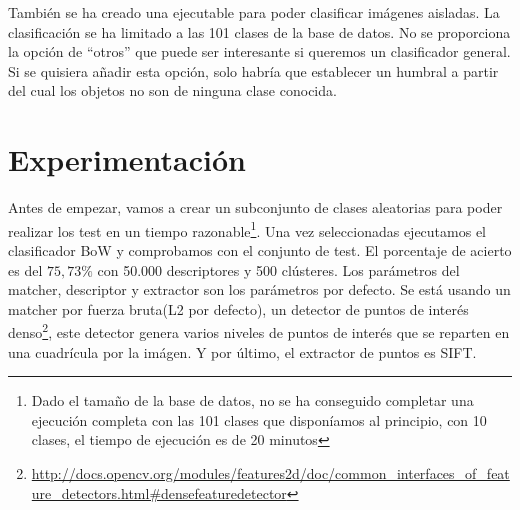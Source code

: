 \documentclass[a4paper,12pt]{article}
\begin{document}
También se ha creado una ejecutable para poder clasificar imágenes aisladas.
La clasificación se ha limitado a las 101 clases de la base de datos. No se 
proporciona la opción de ``otros'' que puede ser interesante si queremos un 
clasificador general. Si se quisiera añadir esta opción, solo habría que 
establecer un humbral a partir del cual los objetos no son de ninguna clase 
conocida.

\newpage
\section{Experimentación}

Antes de empezar, vamos a crear un subconjunto de clases aleatorias para poder
realizar los test en un tiempo razonable\footnote{Dado el tamaño de la base de 
datos, no se ha conseguido completar una ejecución completa con las 101 clases
que disponíamos al principio, con 10 clases, el tiempo de ejecución es de 
20 minutos}. Una vez seleccionadas ejecutamos el 
clasificador BoW y comprobamos con el conjunto de test. El porcentaje 
de acierto es del $75,73\%$ con 50.000 descriptores y 500 clústeres. Los 
parámetros del matcher, descriptor y extractor son los parámetros por defecto.
Se está usando un matcher por fuerza bruta(L2 por defecto), un detector de
puntos de interés denso\footnote{\url{http://docs.opencv.org/modules/features2d/doc/common_interfaces_of_feature_detectors.html\#densefeaturedetector}}, este detector genera varios niveles de puntos de 
interés que se reparten en una cuadrícula por la imágen. Y por último, el 
extractor de puntos es SIFT. 
\end{document}
